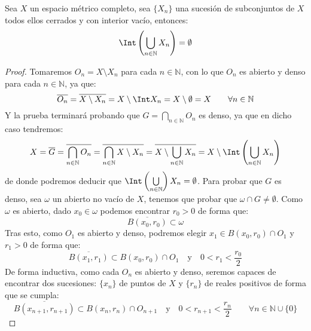 \begin{lema}[de Baire]\label{lema:Baire}
    Sea $X$ un espacio métrico completo, sea $\{X_n\}$ una sucesión de subconjuntos de $X$ todos ellos cerrados y con interior vacío, entonces:
    \begin{equation*}
        \Int\left(\bigcup_{n\in \mathbb{N}} X_n\right) = \emptyset 
    \end{equation*}
    \begin{proof}
        Tomaremos $O_n = X\setminus X_n$ para cada $n\in \mathbb{N}$, con lo que $O_n$ es abierto y denso para cada $n\in \mathbb{N}$, ya que:
        \begin{equation*}
            \overline{O_n} = \overline{X\setminus X_n} = X\setminus \Int X_n = X\setminus \emptyset  = X \qquad \forall n\in \mathbb{N}
        \end{equation*}
        Y la prueba terminará probando que $G = \bigcap\limits_{n\in \mathbb{N}}O_n$ es denso, ya que en dicho caso tendremos:
        \begin{equation*}
            X = \overline{G} = \overline{\bigcap\limits_{n\in \mathbb{N}}O_n} = \overline{\bigcap_{n\in \mathbb{N}} X\setminus X_n} = \overline{X\setminus\bigcup_{n\in \mathbb{N}}X_n} = X\setminus \Int\left(\bigcup_{n\in \mathbb{N}}X_n\right)
        \end{equation*}
        de donde podremos deducir que $\Int\left(\bigcup\limits_{n\in \mathbb{N}}\right)X_n = \emptyset $. Para probar que $G$ es denso, sea $\omega$ un abierto no vacío de $X$, tenemos que probar que $\omega\cap G \neq \emptyset $. Como $\omega$ es abierto, dado $x_0\in \omega$ podemos encontrar $r_0>0$ de forma que:
        \begin{equation*}
            \overline{B(x_0,r_0)}\subset \omega
        \end{equation*}
        Tras esto, como $O_1$ es abierto y denso, podremos elegir $x_1 \in B(x_0,r_0)\cap O_1$ y $r_1>0$ de forma que:
        \begin{equation*}
            \overline{B(x_1,r_1)}\subset B(x_0,r_0) \cap O_1 \quad \text{y}\quad 0<r_1<\frac{r_0}{2}
        \end{equation*}
        De forma inductiva, como cada $O_n$ es abierto y denso, seremos capaces de encontrar dos sucesiones: $\{x_n\}$ de puntos de $X$ y $\{r_n\}$ de reales positivos de forma que se cumpla:
        \begin{equation*}
            \overline{B(x_{n+1},r_{n+1})}\subset B(x_n,r_n) \cap O_{n+1} \quad \text{y}\quad 0<r_{n+1}<\frac{r_n}{2} \qquad \forall n\in \mathbb{N}\cup \{0\}

\end{equation*}
\end{proof}
\end{lema}
